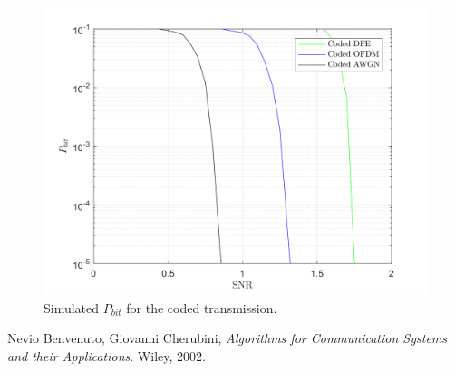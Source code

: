 \documentclass[a4paper, 12pt]{report}
\begin{document}
\begin{figure}[H]
	\centering
	\includegraphics[width=14cm]{coded}
	\caption{Simulated $P_{bit}$ for the coded transmission.}\label{coded}
\end{figure}

\begin{thebibliography}{15}
	Nevio Benvenuto, Giovanni Cherubini,
	\textit{Algorithms for Communication Systems and their Applications}. 
	Wiley, 2002.
\end{thebibliography}

%	
%		
%	
%		
%		
%	
\end{document}
